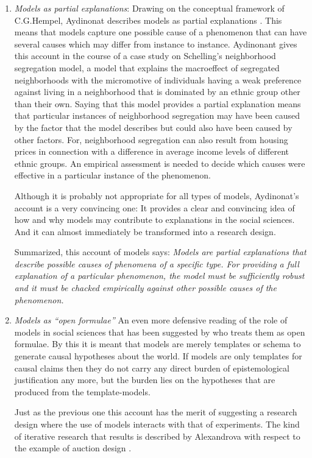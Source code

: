 \documentclass[onecollarge]{STJour}
\numberwithin{equation}{section}
\begin{document}
\begin{enumerate}
  \item {\em Models as partial explanations}: Drawing on the conceptual
  framework of C.G.Hempel, Aydinonat describes models as partial
  explanations \citep[]{aydinonat:2007}. This means that models capture
  one possible cause of a phenomenon that can have several causes which
  may differ from instance to instance. Aydinonant gives this account in
  the course of a case study on Schelling's neighborhood segregation
  model, a model that explains the macroeffect of segregated
  neighborhoods with the micromotive of individuals having a weak
  preference against living in a neighborhood that is dominated by an
  ethnic group other than their own. Saying that this model provides a
  partial explanation means that particular instances of neighborhood
  segregation may have been caused by the factor that the model
  describes but could also have been caused by other factors. For,
  neighborhood segregation can also result from housing prices in
  connection with a difference in average income levels of different
  ethnic groups. An empirical assessment is needed to decide which causes were
  effective in a particular instance of the phenomenon.
  
  Although it is probably not appropriate for all types of models, 
  Aydinonat's account is a very convincing one: It provides a clear and
  convincing idea of how and why models may contribute to explanations
  in the social sciences. And it can almost immediately be transformed
  into a research design. 
  
  Summarized, this account of models says: {\em Models are partial
  explanations that describe possible causes of phenomena of a specific
  type. For providing a full explanation of a particular phenomenon, the
  model must be sufficiently robust and it must be chacked empirically
  against other possible causes of the phenomenon.}

  \item {\em Models as ``open formulae''} An even more defensive reading
  of the role of models in social sciences that has been suggested by
  \citet{alexandrova:2008} who treats them as open formulae. By this it
  is meant that models are merely templates or schema to generate causal
  hypotheses about the world. If models are only templates for causal
  claims then they do not carry any direct burden of epistemological
  justification any more, but the burden lies on the hypotheses that are
  produced from the template-models.
  
  Just as the previous one this account has the merit of suggesting a
  research design where the use of models interacts with that of
  experiments. The kind of iterative research that results is described
  by Alexandrova with respect to the example of auction design
  \citep[p.\ 384ff.]{alexandrova:2008}.
  

\end{enumerate}
\end{document}
